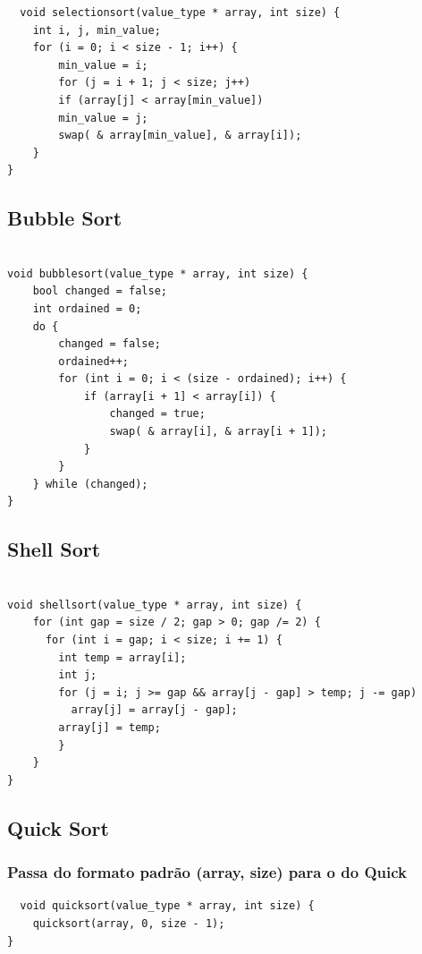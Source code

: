 \documentclass[a4paper, 12pt]{article}
\begin{document}
\begin{lstlisting}
  void selectionsort(value_type * array, int size) {
	int i, j, min_value;
	for (i = 0; i < size - 1; i++) {
		min_value = i;
		for (j = i + 1; j < size; j++)
		if (array[j] < array[min_value])
		min_value = j;
		swap( & array[min_value], & array[i]);
	}
}
\end{lstlisting}



\subsection{Bubble Sort}

\begin{lstlisting}

void bubblesort(value_type * array, int size) {
	bool changed = false;
	int ordained = 0;
	do {
		changed = false;
		ordained++;
		for (int i = 0; i < (size - ordained); i++) {
			if (array[i + 1] < array[i]) {
				changed = true;
				swap( & array[i], & array[i + 1]);
			}
		}
	} while (changed);
}
\end{lstlisting}



\subsection{Shell Sort}

\begin{lstlisting}

void shellsort(value_type * array, int size) {
	for (int gap = size / 2; gap > 0; gap /= 2) {
	  for (int i = gap; i < size; i += 1) {
		int temp = array[i];
		int j;
		for (j = i; j >= gap && array[j - gap] > temp; j -= gap)
		  array[j] = array[j - gap];
		array[j] = temp;
	    }
	}
}
\end{lstlisting}



\subsection{Quick Sort}
\subsubsection{Passa do formato padrão (array, size) para o do Quick}
\begin{lstlisting}
  void quicksort(value_type * array, int size) {
	quicksort(array, 0, size - 1);
}

\end{lstlisting}
\end{document}
